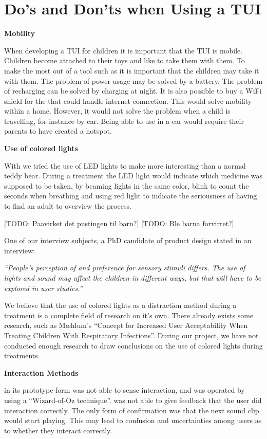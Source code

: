 \section{Do's and Don'ts when Using a TUI}
\label{sec:dosanddontsfortui}

\textbf{Mobility}

When developing a TUI for children it is important that the TUI is mobile. Children become attached to their toys and like to take them with them. To make the most out of a tool such as \buddy{} it is important that the children may take it with them. The problem of power usage may be solved by a battery. The problem of recharging can be solved by charging at night. It is also possible to buy a WiFi shield for the \rpi{} that could handle internet connection. This would solve mobility within a home. However, it would not solve the problem when a child is travelling, for instance by car. Being able to use \ab{} in a car would require their parents to have created a hotspot.   

\textbf{Use of colored lights}

With \buddy{} we tried the use of LED lights to make \buddy{} more interesting than a normal teddy bear. During a treatment the LED light would indicate which medicine was supposed to be taken, by beaming lights in the same color, blink to count the seconds when breathing and using red light to indicate the seriousness of having to find an adult to overview the process. 

[TODO: Paavirket det pustingen til barn?]
[TODO: Ble barna forvirret?]

One of our interview subjects, a PhD candidate of product design stated in an interview: 

\textit{``People's perception of and preference for sensory stimuli differs. The use of lights and sound may affect the children in different ways, but that will have to be explored in user studies.''} 

We believe that the use of colored lights as a distraction method during a treatment is a complete field of research on it's own. There already exists some research, such as M\ae hlum's ``Concept for Increased User Acceptability When Treating Children With Respiratory Infections\cite{mahlum2013}''. During our project, we have not conducted enough research to draw conclusions on the use of colored lights during treatments. 


\textbf{Interaction Methods}

\buddy{} in its prototype form was not able to sense interaction, and was operated by using a ``Wizard-of-Oz technique''\cite{wilson1988rapid}. \buddy{} was not able to give feedback that the user did interaction correctly. The only form of confirmation was that the next sound clip would start playing. This may lead to confusion and uncertainties among users as to whether they interact correctly. 
